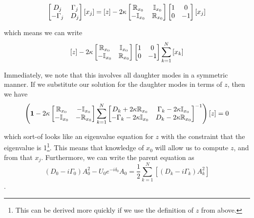 \begin{equation}
\begin{bmatrix}
D_j & \Gamma_j \\
-\Gamma_j & D_j \\
\end{bmatrix}
\left[x_j \right]
=
\left[z\right] 
- 2\kappa
\begin{bmatrix}
\mathbb{R}_{x_0} & \mathbb{I}_{x_0} \\
-\mathbb{I}_{x_0} & \mathbb{R}_{x_0} \\
\end{bmatrix}
\begin{bmatrix}
1 & 0 \\
0 & -1 \\
\end{bmatrix}
\left[x_j\right]
\end{equation}

which means we can write
\begin{equation}
\left[z\right] 
- 2\kappa
\begin{bmatrix}
\mathbb{R}_{x_0} & \mathbb{I}_{x_0} \\
-\mathbb{I}_{x_0} & \mathbb{R}_{x_0} \\
\end{bmatrix}
\begin{bmatrix}
1 & 0 \\
0 & -1 \\
\end{bmatrix}
\sum_{k=1}^{N}\left[x_k\right]
\end{equation}

Immediately, we note that this involves all daughter modes in a symmetric manner. If we substitute our solution for the daughter modes in terms of $z$, then we have
\begin{equation}
\left( \mathbf{1}
- 2\kappa
\begin{bmatrix}
\mathbb{R}_{x_0} & -\mathbb{I}_{x_0} \\
-\mathbb{I}_{x_0} & -\mathbb{R}_{x_0} \\
\end{bmatrix}
\sum_{k=1}^{N}
\begin{bmatrix}
D_k + 2\kappa\mathbb{R}_{x_0}  & \Gamma_k - 2\kappa\mathbb{I}_{x_0} \\
-\Gamma_k - 2\kappa\mathbb{I}_{x_0} & D_k - 2\kappa\mathbb{R}_{x_0} \\
\end{bmatrix}^{-1}
\right) \left[z\right]
= 0
\end{equation}

which sort-of looks like an eigenvalue equation for $z$ with the constraint that the eigenvalue is 1\footnote{This can be derived more quickly if we use the definition of $z$ from above.}. This means that knowledge of $x_0$ will allow us to compute $z$, and from that $x_j$. Furthermore, we can write the parent equation as
\begin{equation}
(D_0 - i \Gamma_0)A_0^2 - U_0 e^{-i\delta_0} A_0 = \frac{1}{2} \sum_{k=1}^{N} \left[ (D_k - i\Gamma_k)A_k^2\right]
\end{equation}.

